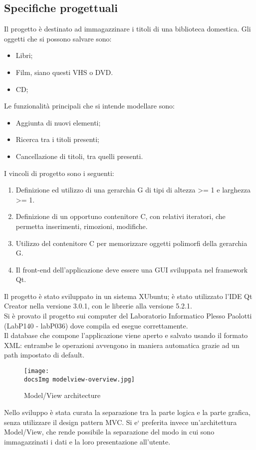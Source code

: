 {	\subsection{Specifiche progettuali}{
		Il progetto è destinato ad immagazzinare i titoli di una biblioteca domestica. Gli oggetti che si possono salvare sono:
		\begin{itemize}\itemsep0.5pt
			\item Libri;
			\item Film, siano questi  VHS o DVD.
			\item CD;
		\end{itemize}
		Le funzionalità principali che si intende modellare sono:
		\begin{itemize}\itemsep0.5pt
			\item Aggiunta di nuovi elementi;
			\item Ricerca tra i titoli presenti;
			\item Cancellazione di titoli, tra quelli presenti.
		\end{itemize}
		I vincoli di progetto sono i seguenti:
		\begin{enumerate}\itemsep0.5pt
			\item Definizione ed utilizzo di una gerarchia G di tipi di altezza >= 1 e larghezza >= 1.
			\item Definizione di un opportuno contenitore C, con relativi iteratori, che permetta inserimenti, rimozioni, modifiche.
			\item Utilizzo del contenitore C per memorizzare oggetti polimorfi della gerarchia G.
			\item Il front-end dell’applicazione deve essere una GUI sviluppata nel framework Qt.
		\end{enumerate}
		Il progetto è stato sviluppato in un sistema XUbuntu; è stato utilizzato l'IDE Qt Creator nella versione 3.0.1, con le librerie alla versione 5.2.1.	\\
		Si è provato il progetto sui computer del Laboratorio Informatico Plesso Paolotti (LabP140 - labP036) dove compila ed esegue correttamente.\\
		Il database che compone l'applicazione viene aperto e salvato usando il formato XML: entrambe le operazioni avvengono in maniera automatica grazie ad un path impostato di default. \\
	
	\begin{figure}[h]
		\begin{center}
			\texttt{[image: \\docsImg modelview-overview.jpg]}
			\caption{Model/View architecture}
		\end{center}
	\end{figure}
		Nello sviluppo è stata curata la separazione tra la parte logica e la parte grafica, senza utilizzare il design pattern MVC. Si e` preferita invece un'architettura Model/View, che rende possibile la separazione del modo in cui sono immagazzinati i dati e la loro presentazione all'utente. %
	}
}